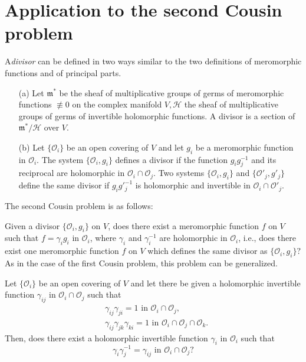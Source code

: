 \section{Application to the second Cousin problem}\label{chap10:sec3}

\medskip
{} A\pageoriginale \textit{divisor} can be defined in two
ways similar to the two definitions of meromorphic functions and of
principal parts. 
\begin{itemize}
\item[(a)] Let $\mathfrak{m}^\ast$ be the sheaf of multiplicative
  groups of germs of meromorphic functions $\not\equiv 0$ on the
  complex manifold $V, \mathscr{H}$ the sheaf of multiplicative groups
  of germs of invertible holomorphic functions. A divisor is a section
  of $\mathfrak{m}^\ast/ \mathscr{H}$ over $V$. 

\item[(b)] Let $\{\mathscr{O}_i\}$ be an open covering of $V$ and let
  $g_i$ be a meromorphic function in $\mathscr{O}_i$. The system
  $\{\mathscr{O}_i,g_i\}$ defines a divisor if the function $g_i
  g^{-1}_j$ and its reciprocal are holomorphic in $\mathscr{O}_i \cap
  \mathscr{O}_j$. Two systems $\{\mathscr{O}_i, g_i\}$ and
  $\{\mathscr{O}'_j, g'_j\}$ define the same divisor if $g_i
  g'^{-1}_j$ is holomorphic and invertible in $\mathscr{O}_i \cap
  \mathscr{O}'_j$. 
\end{itemize}

The second Cousin problem is as follows:

Given a divisor $\{\mathscr{O}_i, g_i\}$ on $V$, does there exist a
meromorphic function $f$ on $V$ such that $f = \gamma_ig_i$  in
$\mathscr{O}_i$, where $\gamma_i$ and $\gamma^{-1}_i$ are holomorphic
in $\mathscr{O}_i$, i.e., does there exist one meromorphic function
$f$ on $V$ which defines the same divisor as $\{\mathscr{O}_i, g_i\}
?$ As in the case  of the first Cousin problem, this problem can be
generalized. 

Let $\{\mathscr{O}_i\}$ be an open covering of $V$ and let there be
given a holomorphic invertible function $\gamma_{ij}$ in
$\mathscr{O}_i \cap \mathscr{O}_j$ such that 
\begin{align*}
& \gamma_{ij} \gamma_{ji} =1 \text{ in } \mathscr{O}_i \cap
  \mathscr{O}_j, \\
& \gamma_{ij} \gamma_{jk} \gamma_{ki} = 1 \text{ in } \mathscr{O}_i
  \cap \mathscr{O}_j \cap \mathscr{O}_k. 
\end{align*}
Then, does there exist a holomorphic invertible function $\gamma_i$ in
$\mathscr{O}_i$ such that 
$$
\gamma_i \gamma^{-1}_j = \gamma_{ij} \text{ in } \mathscr{O}_i \cap
\mathscr{O}_j ?
$$

